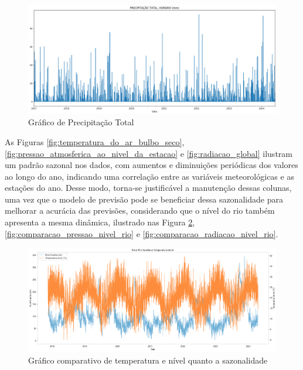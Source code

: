 \begin{figure}[H]
	\caption{\label{fig:precipitacao_total}Gráfico de Precipitação Total}
	\begin{center}
		\includegraphics[scale=0.35]{figuras/precipitacao_total_horario.png}
	\end{center}
\end{figure}

As Figuras \ref{fig:temperatura_do_ar_bulbo_seco}, \ref{fig:pressao_atmosferica_ao_nivel_da_estacao} e \ref{fig:radiacao_global} ilustram um padrão sazonal nos dados, com aumentos e diminuições periódicas dos valores ao longo do ano, indicando uma correlação entre as variáveis meteorológicas e as estações do ano. Desse modo, torna-se justificável a manutenção dessas colunas, uma vez que o modelo de previsão pode se beneficiar dessa sazonalidade para melhorar a acurácia das previsões, considerando que o nível do rio também apresenta a mesma dinâmica, ilustrado nas Figura \ref{fig:comparacao_temp_nivel_rio}, \ref{fig:comparacao_pressao_nivel_rio} e \ref{fig:comparacao_radiacao_nivel_rio}.

\begin{figure}[H]
	\caption{\label{fig:comparacao_temp_nivel_rio}Gráfico comparativo de temperatura e nível quanto a sazonalidade}
	\begin{center}
		\includegraphics[scale=0.35]{figuras/comparacao_temp_nivel_rio.png}
	\end{center}
\end{figure}

